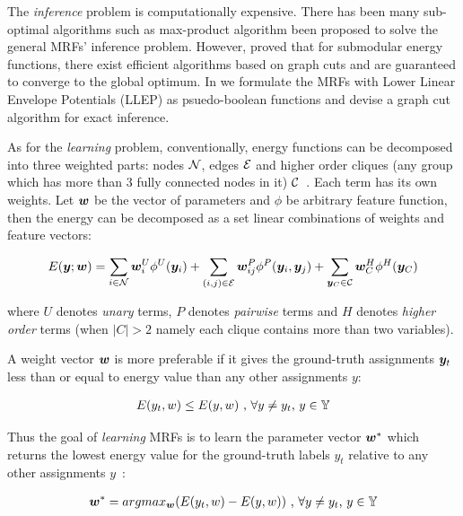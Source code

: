 The \emph{inference} problem is computationally expensive. There
has been many sub-optimal algorithms such as max-product
algorithm \cite{Globerson:NIPS07} been proposed to solve the
general MRFs' inference problem. However, 
proved that for submodular energy functions, there exist
efficient algorithms based on graph cuts
\cite{Ishikawa:CVPR09,Kohli:TR08} and are guaranteed to converge
to the global optimum. In  we formulate the
MRFs with Lower Linear Envelope Potentials (LLEP) as
psuedo-boolean functions and devise a graph cut algorithm for
exact inference.

As for the \emph{learning} problem, conventionally, energy
functions can be decomposed into three weighted parts: nodes
${\mathcal{N}}$, edges ${\mathcal{E}}$ and higher order cliques (any group which has
more than 3 fully connected nodes in it)
${\mathcal{C}}$~\cite{Szummer:ECCV08}. Each term has its own weights. Let
${\bm{w}}$ be the vector of parameters and $\phi$ be arbitrary feature
function, then the energy can be decomposed as a set linear
combinations of weights and feature vectors:

\begin{align}
  \label{eq:energyfunction_UPH}
  E({\bm{y}};{\bm{w}})=\sum_{i\in {\mathcal{N}}}{{\bm{w}}_i^U\phi^U({\bm{y}}_i)}+
  \sum_{(i,j)\in {\mathcal{E}}}{{\bm{w}}_{ij}^P\phi^P({\bm{y}}_i,{\bm{y}}_j)}+
  \sum_{{\bm{y}}_C\in {\mathcal{C}}}{{\bm{w}}_C^H\phi^H({\bm{y}}_C)}
\end{align}

\noindent where $U$ denotes \emph{unary} terms, $P$ denotes
\emph{pairwise} terms and $H$ denotes \emph{higher order} terms
(when $|C|>2$ namely each clique contains more than two
variables).

A weight vector ${\bm{w}}$ is more preferable if it gives the
ground-truth assignments ${\bm{y}}_t$ less than or equal to energy
value than any other assignments $y$:

\begin{align}
E(y_t,w)\leq E(y,w)~ \text{,~}\forall y \neq y_t
\text{,~} y\in {\mathbb{Y}}
\end{align}

Thus the goal of \emph{learning} MRFs is to learn the parameter
vector ${\bm{w}}^*$ which returns the lowest energy value for the
ground-truth labels $y_t$ relative to any other assignments
$y$~\cite{Szummer:ECCV08}:

\begin{align}
{\bm{w}}^* = argmax_{{\bm{w}}}(E(y_t,w)-E(y,w))~ \text{,~}\forall y \neq y_t
\text{,~} y\in {\mathbb{Y}}
\end{align}

